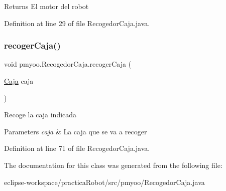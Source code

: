 \begin{DoxyReturn}{Returns}
El motor del robot 
\end{DoxyReturn}


Definition at line 29 of file Recogedor\+Caja.\+java.

\mbox{\label{classpmyoo_1_1_recogedor_caja_af00b81c904386ff1758a3afde032baec}} 
\subsubsection{\texorpdfstring{recogerCaja()}{recogerCaja()}}
{\footnotesize\ttfamily void pmyoo.\+Recogedor\+Caja.\+recoger\+Caja (\begin{DoxyParamCaption}\item[{\mbox{\hyperlink{classpmyoo_1_1_caja}{Caja}}}]{caja }\end{DoxyParamCaption})}

Recoge la caja indicada 
\begin{DoxyParams}{Parameters}
{\em caja} & La caja que se va a recoger \\
\hline
\end{DoxyParams}


Definition at line 71 of file Recogedor\+Caja.\+java.



The documentation for this class was generated from the following file\+:\begin{DoxyCompactItemize}
\item 
eclipse-\/workspace/practica\+Robot/src/pmyoo/Recogedor\+Caja.\+java\end{DoxyCompactItemize}
